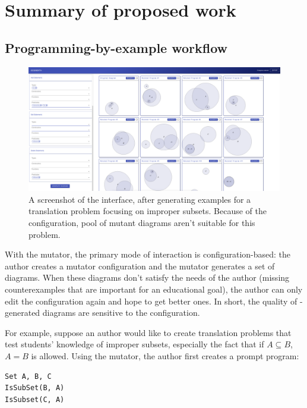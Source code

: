 \section{Summary of proposed work}

\subsection{Programming-by-example workflow}


\begin{figure}
    \centering
    \includegraphics[width=\linewidth]{assets/appendix/edgeworth-bad-output.pdf}
    \caption{A screenshot of the \Edgeworth interface, after generating examples for a translation problem focusing on improper subsets. Because of the configuration, pool of mutant diagrams aren't suitable for this problem.}
    \label{fig:edgeworth-bad-output}
\end{figure}


With the \Edgeworth mutator, the primary mode of interaction is configuration-based: the author creates a mutator configuration and the mutator generates a set of diagrams. When these diagrams don't satisfy the needs of the author (\eg missing counterexamples that are important for an educational goal), the author can only edit the configuration again and hope to get better ones. In short, the quality of \Edgeworth-generated diagrams are sensitive to the configuration. 

For example, suppose an author would like to create translation problems that test students' knowledge of improper subsets, especially the fact that if $A \subseteq B$, $A = B$ is allowed. Using the \Edgeworth mutator, the author first creates a prompt \Substance program:

\begin{verbatim}
Set A, B, C
IsSubSet(B, A)
IsSubset(C, A)
\end{verbatim}

